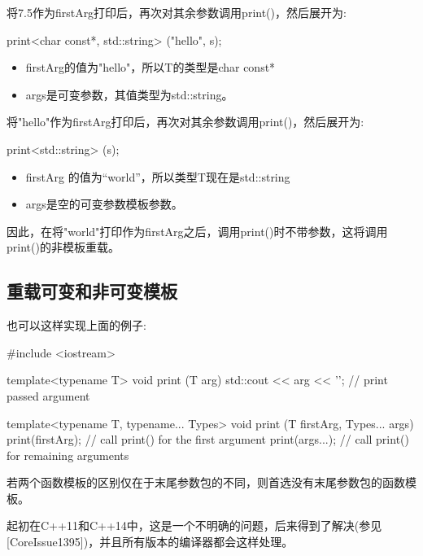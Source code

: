 将7.5作为firstArg打印后，再次对其余参数调用print()，然后展开为:

\begin{cpp}
print<char const*, std::string> ("hello", s);
\end{cpp}

\begin{itemize}
\item 
firstArg的值为"hello"，所以T的类型是char const*

\item 
args是可变参数，其值类型为std::string。
\end{itemize}

将"hello"作为firstArg打印后，再次对其余参数调用print()，然后展开为:

\begin{cpp}
print<std::string> (s);
\end{cpp}

\begin{itemize}
\item 
firstArg 的值为“world”，所以类型T现在是std::string

\item 
args是空的可变参数模板参数。
\end{itemize}

因此，在将"world"打印作为firstArg之后，调用print()时不带参数，这将调用print()的非模板重载。

\subsection{重载可变和非可变模板}

也可以这样实现上面的例子:

\begin{cpp}
#include <iostream>

template<typename T>
void print (T arg)
{
	std::cout << arg << '\n'; // print passed argument
}

template<typename T, typename... Types>
void print (T firstArg, Types... args)
{
	print(firstArg); // call print() for the first argument
	print(args...); // call print() for remaining arguments
}
\end{cpp}

若两个函数模板的区别仅在于末尾参数包的不同，则首选没有末尾参数包的函数模板。

\begin{notice}
起初在C++11和C++14中，这是一个不明确的问题，后来得到了解决(参见[CoreIssue1395])，并且所有版本的编译器都会这样处理。
\end{notice}

